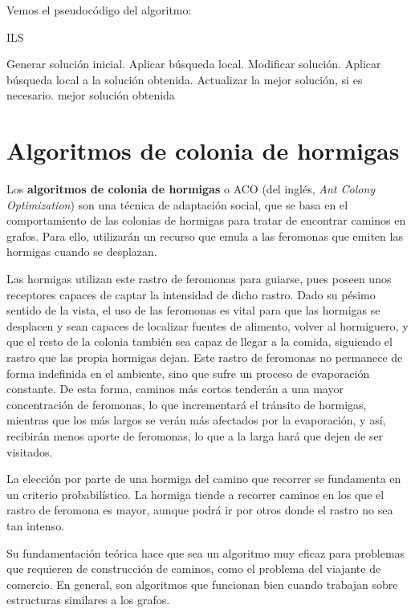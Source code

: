 Vemos el pseudocódigo del algoritmo:

\begin{algorithm}[H]
\caption{ILS}
  \begin{algorithmic}
    \State Generar solución inicial.
    \State Aplicar búsqueda local.
    \Repeat
      \State Modificar solución.
      \State Aplicar búsqueda local a la solución obtenida.
      \State Actualizar la mejor solución, si es necesario.
    \Return mejor solución obtenida
  \EndFunction
  \end{algorithmic}
\end{algorithm}

\section{Algoritmos de colonia de hormigas}\label{aco}

Los \textbf{algoritmos de colonia de hormigas} \citep{dorigo:1996} o ACO
(del inglés, \textit{Ant Colony Optimization}) son una técnica de adaptación social,
que se basa en el comportamiento de las colonias de hormigas para tratar de encontrar
caminos en grafos. Para ello, utilizarán un recurso que emula a las feromonas que
emiten las hormigas cuando se desplazan.

Las hormigas utilizan este rastro de feromonas para guiarse, pues poseen unos receptores
capaces de captar la intensidad de dicho rastro. Dado su pésimo sentido de la vista,
el uso de las feromonas es vital para que las hormigas se desplacen y sean capaces de
localizar fuentes de alimento, volver al hormiguero, y que el resto de la colonia también
sea capaz de llegar a la comida, siguiendo el rastro que las propia hormigas dejan.
Este rastro de feromonas no permanece de forma indefinida en el ambiente, sino que
sufre un proceso de evaporación constante. De esta forma, caminos más cortos tenderán
a una mayor concentración de feromonas, lo que incrementará el tránsito de hormigas,
mientras que los más largos se verán más afectados por la evaporación, y así,
recibirán menos aporte de feromonas, lo que a la larga hará que dejen de ser visitados.

La elección por parte de una hormiga del camino que recorrer se fundamenta en un
criterio probabilístico. La hormiga tiende a recorrer caminos en los que el rastro
de feromona es mayor, aunque podrá ir por otros donde el rastro no sea tan intenso.

Su fundamentación teórica hace que sea un algoritmo muy eficaz para problemas que
requieren de construcción de caminos, como el problema del viajante de comercio.
En general, son algoritmos que funcionan bien cuando trabajan sobre estructuras
similares a los grafos.

